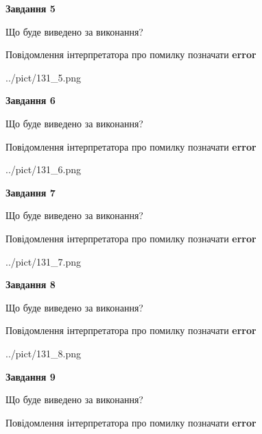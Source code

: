 \documentclass[11pt, ukrainian]{article}
\begin{document}
{\begin {large}
{\begin {center}\textbf{Завдання 5}\end {center}}\par
Що буде виведено за виконання? \par
Повідомлення інтерпретатора про помилку позначати \textbf{error}

\begin{center}
	{../pict/131_5.png}
\end{center}
\newpage

{\begin {center}\textbf{Завдання 6}\end {center}}\par
Що буде виведено за виконання? \par
Повідомлення інтерпретатора про помилку позначати \textbf{error}

\begin{center}
	{../pict/131_6.png}
\end{center}
\newpage

{\begin {center}\textbf{Завдання 7}\end {center}}\par
Що буде виведено за виконання? \par
Повідомлення інтерпретатора про помилку позначати \textbf{error}

\begin{center}
	{../pict/131_7.png}
\end{center}
\newpage

{\begin {center}\textbf{Завдання 8}\end {center}}\par
Що буде виведено за виконання? \par
Повідомлення інтерпретатора про помилку позначати \textbf{error}

\begin{center}
	{../pict/131_8.png}
\end{center}
\newpage

{\begin {center}\textbf{Завдання 9}\end {center}}\par
Що буде виведено за виконання? \par
Повідомлення інтерпретатора про помилку позначати \textbf{error}


\end{large}}
\end{document}

